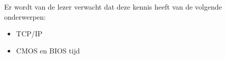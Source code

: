 Er wordt van de lezer verwacht dat deze kennis heeft van de volgende onderwerpen:
\begin{itemize}
\item TCP/IP
\item CMOS en BIOS tijd
\end{itemize}
